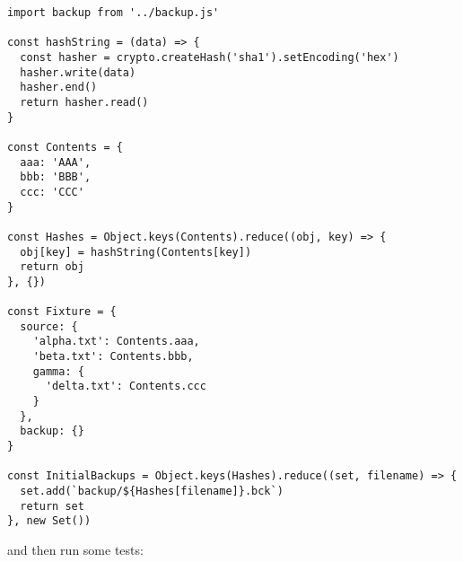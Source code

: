 \documentclass[krantzl]{krantz}
\begin{document}
\begin{lstlisting}[frame=single,frameround=tttt]
import backup from '../backup.js'

const hashString = (data) => {
  const hasher = crypto.createHash('sha1').setEncoding('hex')
  hasher.write(data)
  hasher.end()
  return hasher.read()
}

const Contents = {
  aaa: 'AAA',
  bbb: 'BBB',
  ccc: 'CCC'
}

const Hashes = Object.keys(Contents).reduce((obj, key) => {
  obj[key] = hashString(Contents[key])
  return obj
}, {})

const Fixture = {
  source: {
    'alpha.txt': Contents.aaa,
    'beta.txt': Contents.bbb,
    gamma: {
      'delta.txt': Contents.ccc
    }
  },
  backup: {}
}

const InitialBackups = Object.keys(Hashes).reduce((set, filename) => {
  set.add(`backup/${Hashes[filename]}.bck`)
  return set
}, new Set())
\end{lstlisting}



\noindent and then run some tests:
\end{document}
